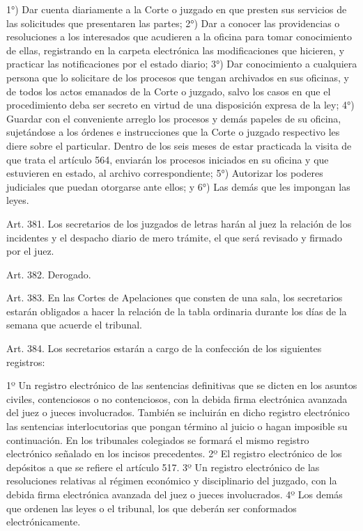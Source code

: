     1°) Dar cuenta diariamente a la Corte o juzgado en que presten sus servicios de las solicitudes que presentaren las partes;
    2°) Dar a conocer las providencias o resoluciones a los interesados que acudieren a la oficina para tomar conocimiento de ellas, registrando en la carpeta electrónica las modificaciones que hicieren, y practicar las notificaciones por el estado diario;
    3°) Dar conocimiento a cualquiera persona que lo solicitare de los procesos que tengan archivados en sus oficinas, y de todos los actos emanados de la Corte o juzgado, salvo los casos en que el procedimiento deba ser secreto en virtud de una disposición expresa de la ley;
    4°) Guardar con el conveniente arreglo los procesos y demás papeles de su oficina, sujetándose a los órdenes e instrucciones que la Corte o juzgado respectivo les diere sobre el particular.
    Dentro de los seis meses de estar practicada la visita de que trata el artículo 564, enviarán los procesos iniciados en su oficina y que estuvieren en estado, al archivo correspondiente;
    5°) Autorizar los poderes judiciales que puedan otorgarse ante ellos; y
    6°) Las demás que les impongan las leyes.



    Art. 381. Los secretarios de los juzgados de letras harán al juez la relación de los incidentes y el despacho diario de mero trámite, el que será revisado y firmado por el juez.

    Art. 382. Derogado.



    Art. 383. En las Cortes de Apelaciones que consten de una sala, los secretarios estarán obligados a hacer la relación de la tabla ordinaria durante los días de la semana que acuerde el tribunal.

    Art. 384. Los secretarios estarán a cargo de la confección de los siguientes registros:
   
    1º Un registro electrónico de las sentencias definitivas que se dicten en los asuntos civiles, contenciosos o no contenciosos, con la debida firma electrónica avanzada del juez o jueces involucrados.
    También se incluirán en dicho registro electrónico las sentencias interlocutorias que pongan término al juicio o hagan imposible su continuación.
    En los tribunales colegiados se formará el mismo registro electrónico señalado en los incisos precedentes.
    2º El registro electrónico de los depósitos a que se refiere el artículo 517.
    3º Un registro electrónico de las resoluciones relativas al régimen económico y disciplinario del juzgado, con la debida firma electrónica avanzada del juez o jueces involucrados.
    4º Los demás que ordenen las leyes o el tribunal, los que deberán ser conformados electrónicamente.



